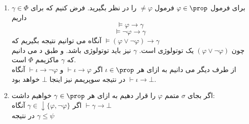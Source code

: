 \begin{ans}
\begin{enumerate}[label=(\alph*)]
        \item 
        برای فرمول 
        $\varphi\in\prop$
        فرمول 
        $\neq\varphi$
        را در نظر بگیرید. 
        فرض کنیم که برای 
        $\gamma\in\Phi$
        داریم 
        \[\models\varphi\to\gamma\]
        \[\models\neg\varphi\to\gamma\]
        آنگاه می توانیم نتیجه بگیریم که 
        $\models(\varphi\vee\neg\varphi)\to\gamma$
        \\
        چون 
        $(\varphi\vee\neg\varphi)$
        یک توتولوژی است. 
        $\gamma$
        نیز باید توتولوژی باشد. و طبق د می دانیم که 
        $\gamma$
        ماکزیمم
        $\Phi$
        است.
        \\
        از طرف دیگر می دانیم به ازای هر 
        $\iota\in\prop$
        اگر 
        $\vdash\iota\to\varphi$
        و
        $\vdash\iota\to\neg\varphi$
        آنگاه
        $\vdash\iota\to\bot$
        در نتیجه سوپریمم نیز اینجا 
        $\bot$
        خواهد بود.

        \item 
        اگر بجای
        $\sigma$
        متمم 
        $\varphi$
        را قرار دهیم به ازای هر 
        $\gamma\in\prop$
        خواهیم داشت:
        \\
        اگر 
        $\gamma\in\downarrow\{\varphi,\neg\varphi\}$
        آنگاه
        $\vdash\gamma\to\bot$
        \\
        در نتیجه 
        $\gamma\leq\psi$
    \end{enumerate}
\end{ans}
